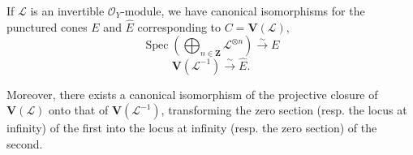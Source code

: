 \begin{proposition}[8.4.4]
\label{II.8.4.4}
If $\mathcal{L}$ is an invertible $\mathcal{O}_Y$-module, we have
canonical isomorphisms for the punctured cones $E$ and $\widehat{E}$
corresponding to $C=\mathbf{V}(\mathcal{L})$,
\begin{equation}
\label{II.8.4.4.1}
  \operatorname{Spec}\left(
    \bigoplus_{n\in\mathbf{Z}}\mathcal{L}^{\otimes n}
  \right)\xrightarrow{\sim}E
\tag{8.4.4.1}
\end{equation}
\begin{equation}
\label{II.8.4.4.2}
  \mathbf{V}(\mathcal{L}^{-1})\xrightarrow{\sim}\widehat{E}.
\tag{8.4.4.2}
\end{equation}

Moreover, there exists a canonical isomorphism of the projective closure of
$\mathbf{V}(\mathcal{L})$ onto that of $\mathbf{V}(\mathcal{L}^{-1})$,
transforming the zero section \textup{(resp.} the locus at infinity\textup{)} of the first into the
locus at infinity \textup{(resp.} the zero section\textup{)} of the second.
\end{proposition}

